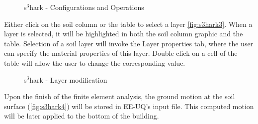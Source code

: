 \begin{figure}[!htbp]
  \caption{s$^3$hark - Configurations and Operations }
  \label{fig:s3hark2}
\end{figure}

Either click on the soil column or the table to select a layer \autoref{fig:s3hark3}. 
When a layer is selected, it will be highlighted in both the soil column graphic and the table. 
Selection of a soil layer will invoke the Layer properties tab, where the user can specify the material properties of this layer.
Double click on a cell of the table will allow the user to change the corresponding value.

\begin{figure}[!htbp]
  \caption{s$^3$hark - Layer modification }
  \label{fig:s3hark3}
\end{figure}


Upon the finish of the finite element analysis, the ground motion at the soil surface (\autoref{fig:s3hark4}) will be stored in EE-UQ's input file.
This computed motion will be later applied to the bottom of the building.

